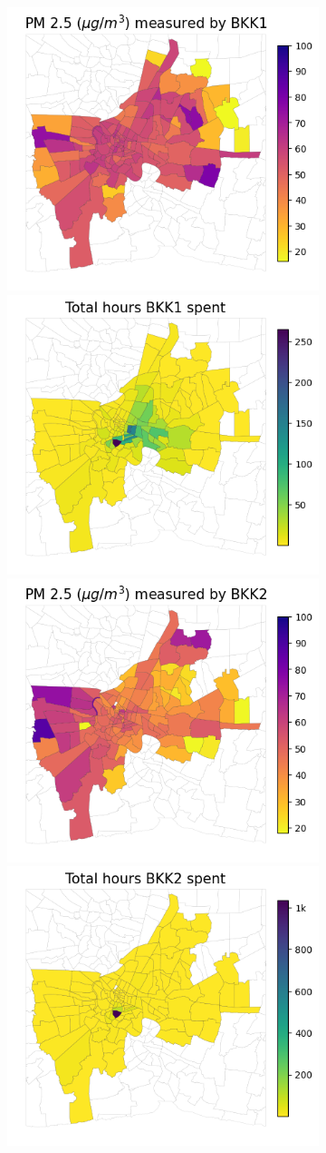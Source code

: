 \begin{figure}
    \centering
    \begin{subfigure}[t]{0.49\textwidth}
        \centering
        \includegraphics[width=.5\linewidth]{figures/map/BKK1_PM25.png}%
        \includegraphics[width=.5\linewidth]{figures/map/BKK1_time.png}
        \includegraphics[width=.5\linewidth]{figures/map/BKK2_PM25.png}%
        \includegraphics[width=.5\linewidth]{figures/map/BKK2_time.png}

\end{subfigure}
\end{figure}
